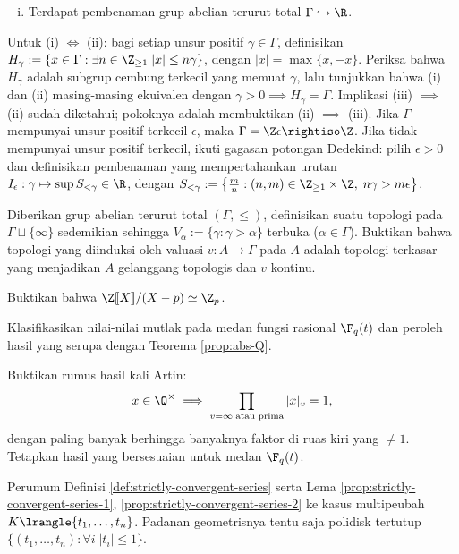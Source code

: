 \begin{Exercises}
\begin{enumerate}[(i)]
			\item Terdapat pembenaman grup abelian terurut total $\Gamma \hookrightarrow \R$.
		\end{enumerate} %
		\begin{hint}
			Untuk (i) $\iff$ (ii): bagi setiap unsur positif $\gamma \in \Gamma$, definisikan $H_\gamma := \left\{x \in \Gamma: \exists n \in \Z_{\geq 1}\; |x| \leq n\gamma \right\}$, dengan $|x|=\max\{x,-x\}$. Periksa bahwa $H_\gamma$ adalah subgrup cembung terkecil yang memuat $\gamma$, lalu tunjukkan bahwa (i) dan (ii) masing-masing ekuivalen dengan $\gamma > 0 \implies H_\gamma = \Gamma$. Implikasi (iii) $\implies$ (ii) sudah diketahui; pokoknya adalah membuktikan (ii) $\implies$ (iii). Jika $\Gamma$ mempunyai unsur positif terkecil $\epsilon$, maka $\Gamma = \Z\epsilon \rightiso \Z$. Jika tidak mempunyai unsur positif terkecil, ikuti gagasan potongan Dedekind: pilih $\epsilon > 0$ dan definisikan pembenaman yang mempertahankan urutan $I_\epsilon: \gamma \mapsto \sup S_{< \gamma} \in \R$, dengan $S_{<\gamma} := \left\{ \frac{m}{n} : (n,m) \in \Z_{\geq 1} \times \Z, \; n\gamma > m\epsilon \right\}$. 
		\end{hint}
	\item Diberikan grup abelian terurut total $(\Gamma, \leq)$, definisikan suatu topologi pada $\Gamma \sqcup \{\infty\}$ sedemikian sehingga $V_\alpha := \{\gamma : \gamma > \alpha \}$ terbuka ($\alpha \in \Gamma$). Buktikan bahwa topologi yang diinduksi oleh valuasi $v: A \to \Gamma$ pada $A$ adalah topologi terkasar yang menjadikan $A$ gelanggang topologis dan $v$ kontinu.
	\item Buktikan bahwa $\Z\llbracket X \rrbracket /(X-p) \simeq \Z_p$. 
	\item Klasifikasikan nilai-nilai mutlak pada medan fungsi rasional $\F_q(t)$ dan peroleh hasil yang serupa dengan Teorema \ref{prop:abs-Q}.
	\item Buktikan rumus hasil kali Artin:
		\[ x \in \Q^\times \implies \prod_{v = \infty \;\text{atau prima}} |x|_v = 1, \]
		dengan paling banyak berhingga banyaknya faktor di ruas kiri yang $\neq 1$. Tetapkan hasil yang bersesuaian untuk medan $\F_q(t)$.
	\item Perumum Definisi \ref{def:strictly-convergent-series} serta Lema \ref{prop:strictly-convergent-series-1}, \ref{prop:strictly-convergent-series-2} ke kasus multipeubah $K\lrangle{t_1, \ldots, t_n}$. Padanan geometrisnya tentu saja polidisk tertutup $\{(t_1, \ldots, t_n) : \forall i\; |t_i| \leq 1 \}$.

\end{Exercises}
